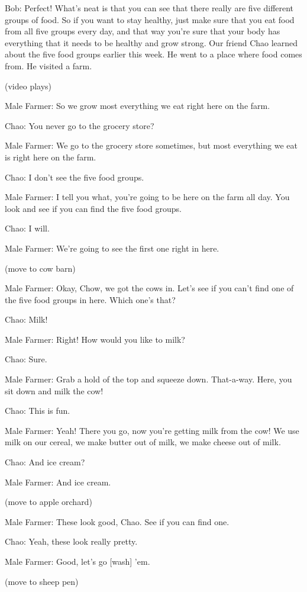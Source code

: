 Bob: Perfect! What's neat is that you can see that there really are five different groups of food. So if you want to stay healthy, just make sure that you eat food from all five groups every day, and that way you're sure that your body has everything that it needs to be healthy and grow strong. Our friend Chao learned about the five food groups earlier this week. He went to a place where food comes from. He visited a farm.

(video plays)

Male Farmer: So we grow most everything we eat right here on the farm.

Chao: You never go to the grocery store?

Male Farmer: We go to the grocery store sometimes, but most everything we eat is right here on the farm.

Chao: I don't see the five food groups.

Male Farmer: I tell you what, you're going to be here on the farm all day. You look and see if you can find the five food groups.

Chao: I will.

Male Farmer: We're going to see the first one right in here.

(move to cow barn)

Male Farmer: Okay, Chow, we got the cows in. Let's see if you can't find one of the five food groups in here. Which one's that?

Chao: Milk!

Male Farmer: Right! How would you like to milk?

Chao: Sure.

Male Farmer: Grab a hold of the top and squeeze down. That-a-way. Here, you sit down and milk the cow!

Chao: This is fun.

Male Farmer: Yeah! There you go, now you're getting milk from the cow! We use milk on our cereal, we make butter out of milk, we make cheese out of milk.

Chao: And ice cream?

Male Farmer: And ice cream.

(move to apple orchard)

Male Farmer: These look good, Chao. See if you can find one.

Chao: Yeah, these look really pretty.

Male Farmer: Good, let's go [wash] 'em.

(move to sheep pen)

